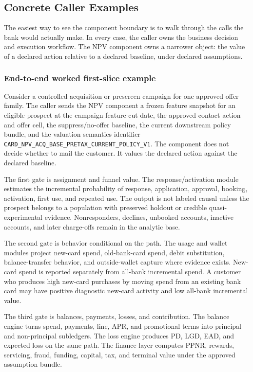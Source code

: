 \documentclass[11pt]{article}
\newcommand{\1}{\mathbf{1}}
\newcommand{\code}[1]{\nolinkurl{#1}}
\begin{document}
\subsection{Concrete Caller Examples}
\label{subsec:concrete-caller-examples}

The easiest way to see the component boundary is to walk through the calls the
bank would actually make. In every case, the caller owns the business decision
and execution workflow. The NPV component owns a narrower object: the value of a
declared action relative to a declared baseline, under declared assumptions.

\subsubsection{End-to-end worked first-slice example}
\label{subsec:worked-first-slice-example}

Consider a controlled acquisition or prescreen campaign for one approved offer
family. The caller sends the NPV component a frozen feature snapshot for an
eligible prospect at the campaign feature-cut date, the approved contact action
and offer cell, the suppress/no-offer baseline, the current downstream policy
bundle, and the valuation semantics identifier
\code{CARD_NPV_ACQ_BASE_PRETAX_CURRENT_POLICY_V1}. The component does not decide
whether to mail the customer. It values the declared action against the
declared baseline.

The first gate is assignment and funnel value. The response/activation module
estimates the incremental probability of response, application, approval,
booking, activation, first use, and repeated use. The output is not labeled
causal unless the prospect belongs to a population with preserved holdout or
credible quasi-experimental evidence. Nonresponders, declines, unbooked
accounts, inactive accounts, and later charge-offs remain in the analytic base.

The second gate is behavior conditional on the path. The usage and wallet
modules project new-card spend, old-bank-card spend, debit substitution,
balance-transfer behavior, and outside-wallet capture where evidence exists.
New-card spend is reported separately from all-bank incremental spend. A
customer who produces high new-card purchases by moving spend from an existing
bank card may have positive diagnostic new-card activity and low all-bank
incremental value.

The third gate is balances, payments, losses, and contribution. The balance
engine turns spend, payments, line, APR, and promotional terms into principal
and non-principal subledgers. The loss engine produces PD, LGD, EAD, and
expected loss on the same path. The finance layer computes PPNR, rewards,
servicing, fraud, funding, capital, tax, and terminal value under the approved
assumption bundle.
\end{document}
